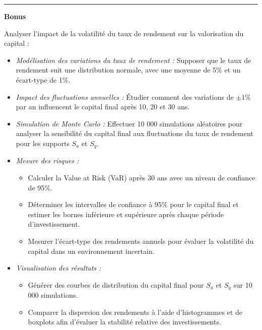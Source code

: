 \documentclass{article}
\begin{document}
\begin{center}
\rule{0.5\textwidth}{.4pt}
\end{center}

\textbf{Bonus}

Analyser l'impact de la volatilité du taux de rendement sur la valorisation du capital :

\begin{itemize}
    \item \textit{Modélisation des variations du taux de rendement :}  
    Supposer que le taux de rendement suit une distribution normale, avec une moyenne de 5\% et un écart-type de 1\%.  
    \item \textit{Impact des fluctuations annuelles :}  
    Étudier comment des variations de $\pm 1\%$ par an influencent le capital final après 10, 20 et 30 ans.  
    \item \textit{Simulation de Monte Carlo :}  
    Effectuer 10 000 simulations aléatoires pour analyser la sensibilité du capital final aux fluctuations du taux de rendement pour les supports $S_a$ et $S_q$.  
    \item \textit{Mesure des risques :}  
    \begin{itemize}
        \item Calculer la Value at Risk (VaR) après 30 ans avec un niveau de confiance de 95\%.  
        \item Déterminer les intervalles de confiance à 95\% pour le capital final et estimer les bornes inférieure et supérieure après chaque période d’investissement.  
        \item Mesurer l’écart-type des rendements annuels pour évaluer la volatilité du capital dans un environnement incertain.  
    \end{itemize}
    \item \textit{Visualisation des résultats :}  
    \begin{itemize}
        \item Générer des courbes de distribution du capital final pour $S_a$ et $S_q$ sur 10 000 simulations.  
        \item Comparer la dispersion des rendements à l’aide d’histogrammes et de boxplots afin d’évaluer la stabilité relative des investissements.  
    \end{itemize}
\end{itemize}
\end{document}
